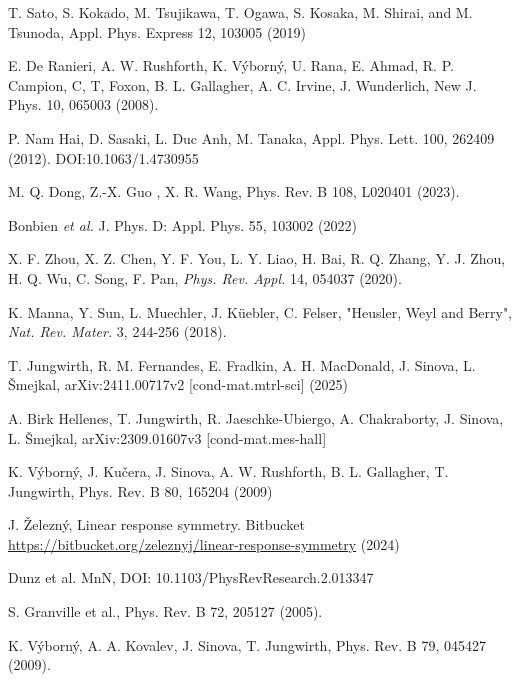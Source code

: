 \documentclass[prb,showpacs,amsmath,amssymb,superscriptaddress,twocolumn,floatfix]{revtex4-1}
\begin{document}
\begin{thebibliography}{99}
 T. Sato, S. Kokado, M. Tsujikawa, T. Ogawa, S. Kosaka, M. Shirai, and M. Tsunoda, Appl. Phys. Express 12, 103005 (2019)

 E. De Ranieri, A. W. Rushforth, K. V\'yborn\'y, U. Rana, E. Ahmad, R. P. Campion, C, T, Foxon, B. L. Gallagher, A. C. Irvine, J. Wunderlich, New J. Phys. 10, 065003 (2008).%


 P. Nam Hai, D. Sasaki, L. Duc Anh, M. Tanaka, Appl. Phys. Lett. 100, 262409 (2012). DOI:10.1063/1.4730955

 M. Q. Dong, Z.-X. Guo , X. R. Wang, Phys. Rev. B 108, L020401 (2023). %

 Bonbien \textit{et al.} J. Phys. D: Appl. Phys. 55, 103002 (2022)

 X. F. Zhou, X. Z. Chen, Y. F. You, L. Y. Liao, H. Bai, R. Q. Zhang, Y. J. Zhou, H. Q. Wu, C. Song, F. Pan, \textit{Phys. Rev. Appl.} 14, 054037 (2020). %


 K. Manna, Y. Sun, L. Muechler, J. K\"uebler, C. Felser, "Heusler, Weyl and Berry", \textit{Nat. Rev. Mater.} 3, 244-256 (2018). %

 T. Jungwirth, R. M. Fernandes, E. Fradkin, A. H. MacDonald, J. Sinova, L. \v{S}mejkal, arXiv:2411.00717v2 [cond-mat.mtrl-sci] (2025) 

 A. Birk Hellenes, T. Jungwirth, R. Jaeschke-Ubiergo, A. Chakraborty, J. Sinova, L. \v{S}mejkal, arXiv:2309.01607v3 [cond-mat.mes-hall]

 K. V\'{y}born\'{y}, J. Ku\v{c}era, J. Sinova, A. W. Rushforth, B. L. Gallagher, T. Jungwirth, Phys. Rev. B 80, 165204 (2009)%

 J. \v{Z}elezn\'y, Linear response symmetry. Bitbucket \url{https://bitbucket.org/zeleznyj/linear-response-symmetry} (2024)

 Dunz et al. MnN, DOI: 10.1103/PhysRevResearch.2.013347


 S. Granville et al., Phys. Rev. B 72, 205127 (2005).

 K. V\'yborn\'y, A. A. Kovalev, J. Sinova, T. Jungwirth, Phys. Rev. B 79, 045427 (2009). %


\end{thebibliography}
\end{document}
